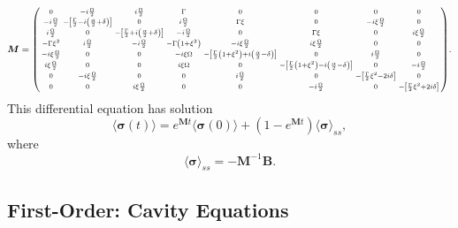 \documentclass{article}
\begin{document}
\begin{equation}
	\bm{M} =
	\begin{psmallmatrix}
		0 & -i \frac{\Omega}{2} & i \frac{\Omega}{2} & \Gamma & 0 & 0 & 0 & 0 \\
		-i \frac{\Omega}{2} & -\left[ \frac{\Gamma}{2} - i \left( \frac{\alpha}{2} + \delta \right) \right] & 0 & i \frac{\Omega}{2} & \Gamma \xi & 0 & -i \xi \frac{\Omega}{2} & 0 \\
		i \frac{\Omega}{2} & 0 & -\left[ \frac{\Gamma}{2} + i \left( \frac{\alpha}{2} + \delta \right) \right] & -i \frac{\Omega}{2} & 0 & \Gamma \xi & 0 & i \xi \frac{\Omega}{2}\\
		-\Gamma \xi^{2} & i \frac{\Omega}{2} & -i \frac{\Omega}{2} & -\Gamma \left( 1 + \xi^{2} \right)& -i \xi \frac{\Omega}{2} & i \xi \frac{\Omega}{2} & 0 & 0 \\
		-i \xi \frac{\Omega}{2} & 0 & 0 & -i \xi \Omega & -\left[ \frac{\Gamma}{2} \left( 1 + \xi^{2} \right) + i \left( \frac{\alpha}{2} - \delta \right) \right] & 0 & i \frac{\Omega}{2} & 0 \\
		i \xi \frac{\Omega}{2} & 0 & 0 & i \xi \Omega & 0 & -\left[ \frac{\Gamma}{2} \left( 1 + \xi^{2} \right) - i \left( \frac{\alpha}{2} - \delta \right) \right] & 0 & -i \frac{\Omega}{2} \\
		0 & -i \xi \frac{\Omega}{2} & 0 & 0 & i \frac{\Omega}{2} & 0 & -\left[ \frac{\Gamma}{2} \xi^{2} - 2 i \delta \right] & 0 \\
		0 & 0 & i \xi \frac{\Omega}{2} & 0 & 0 & -i \frac{\Omega}{2} & 0 & -\left[ \frac{\Gamma}{2} \xi^{2} + 2 i \delta \right]
	\end{psmallmatrix}.
\end{equation}
This differential equation has solution
\begin{equation}
	\langle \bm{\sigma}(t) \rangle = e^{\bm{M} t} \langle \bm{\sigma}(0) \rangle + \left( 1 - e^{\bm{M} t} \right) \langle \bm{\sigma} \rangle_{ss},
\end{equation}
where
\begin{equation}
	\langle \bm{\sigma} \rangle_{ss} = - \bm{M}^{-1} \bm{B}.
\end{equation}

\subsection{First-Order: Cavity Equations}
\end{document}
